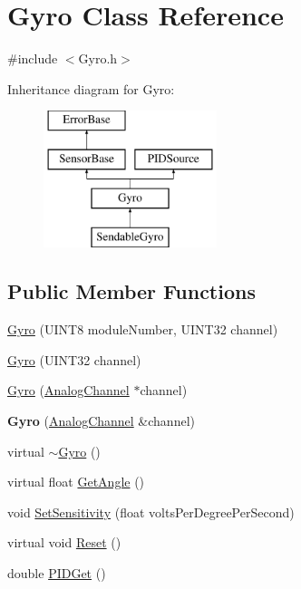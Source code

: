 \hypertarget{classGyro}{
\section{Gyro Class Reference}
\label{classGyro}
}


{\ttfamily \#include $<$Gyro.h$>$}

Inheritance diagram for Gyro:\begin{figure}[H]
\begin{center}
\leavevmode
\includegraphics[height=4.000000cm]{classGyro}
\end{center}
\end{figure}
\subsection*{Public Member Functions}
\begin{DoxyCompactItemize}
\item 
\hyperlink{classGyro_a41b40555c66c615074c504a5be6ed62e}{Gyro} (UINT8 moduleNumber, UINT32 channel)
\item 
\hyperlink{classGyro_afc23fe3ba40c495d1b3a0e10c5abec30}{Gyro} (UINT32 channel)
\item 
\hyperlink{classGyro_ae90174929eaabecb8e1214a0a252ae60}{Gyro} (\hyperlink{classAnalogChannel}{AnalogChannel} $\ast$channel)
\item 
\hypertarget{classGyro_abaedf2b4b315a9e9f26eb9e515f70fb6}{
{\bfseries Gyro} (\hyperlink{classAnalogChannel}{AnalogChannel} \&channel)}
\label{classGyro_abaedf2b4b315a9e9f26eb9e515f70fb6}

\item 
virtual \hyperlink{classGyro_af58b57914897b22014110908326eace2}{$\sim$Gyro} ()
\item 
virtual float \hyperlink{classGyro_a37c29b42b58b90fe1ed11f04c2635d4f}{GetAngle} ()
\item 
void \hyperlink{classGyro_aaf5c11137c5428c427b2a2162cd43f09}{SetSensitivity} (float voltsPerDegreePerSecond)
\item 
virtual void \hyperlink{classGyro_ae13fc1c339cb0267740b86c0585ceac7}{Reset} ()
\item 
double \hyperlink{classGyro_aca619c0201c5fb85e2bbaeef0f39e8e6}{PIDGet} ()
\end{DoxyCompactItemize}
